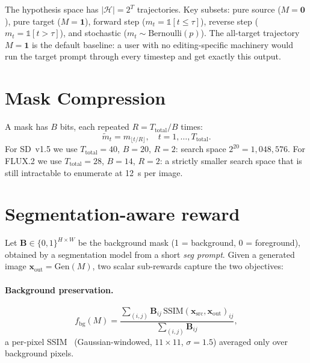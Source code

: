 The hypothesis space has $|\mathcal{H}| = 2^T$ trajectories. Key subsets: pure source ($M = \mathbf{0}$), pure target ($M = \mathbf{1}$), forward step ($m_t = \mathbb{1}[t \leq \tau]$), reverse step ($m_t = \mathbb{1}[t > \tau]$), and stochastic ($m_t \sim \text{Bernoulli}(p)$). The all-target trajectory $M=\mathbf{1}$ is the default baseline: a user with no editing-specific machinery would run the target prompt through every timestep and get exactly this output.

\section{Mask Compression}

A mask has $B$ bits, each repeated $R = T_{\text{total}} / B$ times:
\begin{equation}
    \tilde{m}_t = m_{\lfloor t / R \rfloor}, \quad t = 1, \dots, T_{\text{total}}.
    \label{eq::mask_compression}
\end{equation}
For SD~v1.5 we use $T_{\text{total}} = 40$, $B = 20$, $R=2$: search space $2^{20} = 1{,}048{,}576$. For FLUX.2 we use $T_{\text{total}}=28$, $B = 14$, $R=2$: a strictly smaller search space that is still intractable to enumerate at 12~s per image.

\section{Segmentation-aware reward}
\label{sec:reward}

Let $\mathbf{B}\in\{0,1\}^{H\times W}$ be the background mask (1 = background, 0 = foreground), obtained by a segmentation model from a short \emph{seg prompt}. Given a generated image $\mathbf{x}_{\text{out}}=\text{Gen}(M)$, two scalar sub-rewards capture the two objectives:

\paragraph{Background preservation.}
\begin{equation}
f_{\text{bg}}(M) = \frac{\sum_{(i,j)} \mathbf{B}_{ij}\,\text{SSIM}(\mathbf{x}_{\text{src}}, \mathbf{x}_{\text{out}})_{ij}}{\sum_{(i,j)} \mathbf{B}_{ij}},
\end{equation}
a per-pixel SSIM~\cite{wang2004image} (Gaussian-windowed, $11\!\times\!11$, $\sigma=1.5$) averaged only over background pixels.


